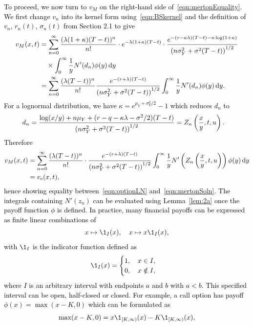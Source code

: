 \textcolor{black}{
To proceed, we now turn to $v_M$ on the right-hand side of~\eqref{eqn:mertonEquality}. We first change $v_n$ into its kernel form using~\eqref{eqn:BSkernel} and the definition of $v_n$, $r_n(t)$, $\sigma_n(t)$ from Section 2.1 to give
	\begin{align*}
		v_M(x,t) &=  \displaystyle\sum\limits_{n=0}^\infty\frac{(\lambda(1+\kappa)(T-t))^n}{n!}\cdot e^{-\lambda(1+\kappa)(T-t)}\cdot \frac{e^{-(r-\kappa\lambda)(T-t)-n\log(1+\kappa)}}{\left(n\sigma_Y^2 + \sigma^2(T-t)\right)^{1/2}} \\
		& \quad {} \times \int_0^\infty \frac{1}{y}N'(d_n) \phi(y) \, \mathrm d y \\
		&= \displaystyle\sum\limits_{n=0}^\infty\frac{(\lambda(T-t))^n}{n!}\frac{e^{-(r+\lambda)(T-t)}}{\left(n\sigma_Y^2 + \sigma^2(T-t)\right)^{1/2}}\int_0^\infty \frac{1}{y}N'(d_n) \phi(y) \, \mathrm d y.
	\end{align*}
For a lognormal distribution, we have $\kappa = e^{\mu_Y + \sigma_Y^2/2} - 1$ which reduces $d_n$ to
	\begin{align*}
		d_n &= \frac{\log(x/y) + n\mu_Y + (r - q - \kappa\lambda - \sigma^2/2)(T-t)}{\left( n\sigma_Y^2 + \sigma^2(T-t) \right)^{1/2}} = Z_n\left(\frac{x}{y},t,u\right).
	\end{align*}
Therefore
	\begin{align*}
		v_M(x,t) &=  \displaystyle\sum\limits_{n=0}^\infty\frac{(\lambda(T-t))^n}{n!}\cdot\frac{e^{-(r+\lambda)(T-t)}}{\left(n\sigma_Y^2 + \sigma^2(T-t)\right)^{1/2}}\int_0^\infty \frac{1}{y}N'\left(Z_n\left( \frac{x}{y},t,u \right)\right) \phi(y) \, \mathrm d y \\
		 &= v_\text{e}(x,t),
	\end{align*}
hence showing equality between~\eqref{eqn:optionLN} and~\eqref{eqn:mertonSoln}. The integrals containing $N'(z_n)$ can be evaluated using Lemma~\ref{lem:2a} once the payoff function $\phi$ is defined. In practice, \textcolor{black}{many} financial payoffs can be expressed as finite linear combinations of
	$$
		x \mapsto \1_{I}(x), \quad x \mapsto x\1_{I}(x),
	$$
with $\1_I$ is the indicator function defined as
	$$
		\1_I(x) = \begin{cases}
			1, \quad x \in I, \\
			0, \quad x \notin I,
		\end{cases}
	$$
where $I$ is an arbitrary interval with endpoints $a$ and $b$ with $a < b$. This specified interval can be open, half-closed or closed. For example, a call option has payoff $\phi(x) = \max(x-K,0)$ which can be formulated as
	$$
		\max(x-K,0) = x\1_{[K,\infty)}(x) - K\1_{[K,\infty)}(x),
$$}
